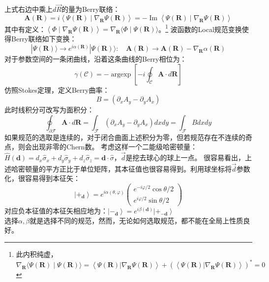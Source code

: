 \documentclass[12pt, a4paper, oneside]{ctexbook}
\begin{document}
	上式右边中乘上$ d\vec{R} $的量为Berry联络：
	\begin{equation}
		\mathbf{A}(\mathbf{R})=i\left\langle\Psi(\mathbf{R}) \mid \nabla_{\mathbf{R}} \Psi(\mathbf{R})\right\rangle=-\operatorname{Im}\left\langle\Psi(\mathbf{R}) \mid \nabla_{\mathbf{R}} \Psi(\mathbf{R})\right\rangle
	\end{equation} 
	其中有定义：$ \left\langle\Phi \mid \nabla_{\mathbf{R}} \Psi(\mathbf{R})\right\rangle=\nabla_{\mathbf{R}}\langle\Phi \mid \Psi(\mathbf{R})\rangle $。\footnote{此内积纯虚，$ \nabla_{\mathbf{R}}\langle\Psi(\mathbf{R}) \mid \Psi(\mathbf{R})\rangle=\left\langle\Psi(\mathbf{R})|\nabla_{\mathbf{R}} \Psi(\mathbf{R})\right\rangle+(\left\langle\Psi(\mathbf{R})|\nabla_{\mathbf{R}} \Psi(\mathbf{R})\right\rangle)^*=0 $ }
	波函数的Local规范变换使得Berry联络如下变换：
	\begin{equation}
		|\Psi(\mathbf{R})\rangle \rightarrow e^{i \alpha(\mathbf{R})}|\Psi(\mathbf{R})\rangle: \quad \mathbf{A}(\mathbf{R}) \rightarrow \mathbf{A}(\mathbf{R})-\nabla_{\mathbf{R}} \alpha(\mathbf{R})
	\end{equation} 
	对于参数空间的一条闭曲线，沿着这条曲线的Berry相位为：
	\begin{equation}
		\gamma(\mathscr{C})=-\operatorname{argexp}\left[-i \oint_{\mathscr{C}} \mathbf{A} \cdot d \mathbf{R}\right]
	\end{equation}
	仿照Stokes定理，定义Berry曲率：
	\begin{equation}
		B=\left(\partial_x A_y-\partial_y A_x\right)
	\end{equation}
	此时线积分可改写为面积分：
	\begin{equation}
		\oint_{\partial \mathscr{F}} \mathbf{A} \cdot d \mathbf{R}=\int_{\mathscr{F}}\left(\partial_x A_y-\partial_y A_x\right) d x d y=\int_{\mathscr{F}} B d x d y
	\end{equation}
	如果规范的选取是连续的，对于闭合曲面上述积分为零，但若规范存在不连续的奇点，则会出现非零的Chern数。
	考虑这样一个二能级哈密顿量：$ \hat{H}(\mathbf{d})=d_x \hat{\sigma}_x+d_y \hat{\sigma}_y+d_z \hat{\sigma}_z=\mathbf{d} \cdot \hat{\sigma} $，$ \vec{d} $是挖去球心的球上一点。
	很容易看出，上述哈密顿量的平方正比于单位矩阵，其本征值也很容易得到。利用球坐标将$ \vec{d} $参数化，很容易得到本征矢：
	\begin{equation}
		\left|+_{\mathbf{d}}\right\rangle=e^{i \alpha(\theta, \varphi)}\left(\begin{array}{c}
			e^{-i \varphi / 2} \cos \theta / 2 \\
			e^{i \varphi / 2} \sin \theta / 2
			\end{array}\right)
	\end{equation}   
	对应负本征值的本征矢相应地为：$ \left|-_{\mathbf{d}}\right\rangle=e^{i \beta(\mathbf{d})}\left|+_{-\mathbf{d}}\right\rangle $\\
	选择$ \alpha,\beta $就是选择不同的规范，然而，无论如何选取规范，都不能在全局上性质良好。  
	
	
\end{document}

